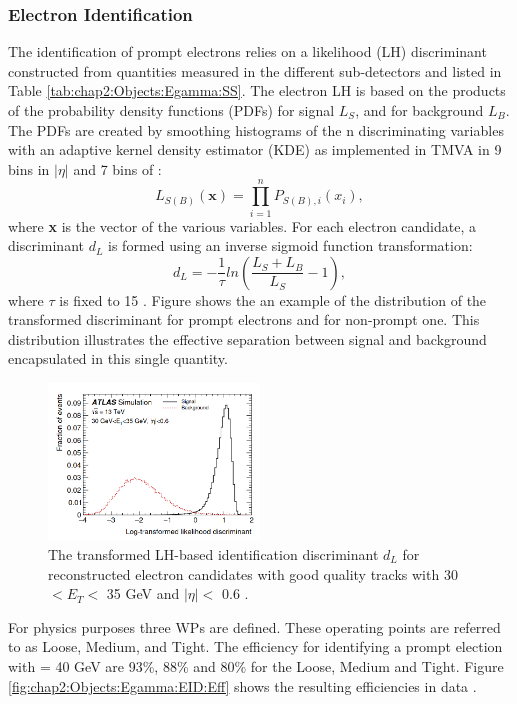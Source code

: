 \subsubsection{Electron Identification}
\label{chap2:Objects:Egamma:EID}
The identification of prompt electrons relies on a likelihood (LH) discriminant constructed from quantities measured in the different sub-detectors and listed in Table \ref{tab:chap2:Objects:Egamma:SS}. The electron LH is based on the products of the probability density functions (PDFs) for signal $L_S$, and for background $L_B$. The PDFs are created by smoothing histograms of the n discriminating variables with an adaptive kernel density estimator (KDE) \cite{KDE} as implemented in TMVA \cite{TMVA} in 9 bins in $|\eta|$ and 7 bins of \eT:
\begin{equation}
    L_{S(B)}(\textbf{x}) = \displaystyle\prod_{i=1}^{n} P_{S(B),i}(x_i),
\end{equation}
where \textbf{x} is the vector of the various variables. For each electron candidate, a discriminant $d_L$ is formed using an inverse sigmoid function transformation:
\begin{equation}
    d_L = -\frac{1}{\tau}ln(\frac{L_S+L_B}{L_S} - 1),
\end{equation}
where $\tau$ is fixed to 15 \cite{TMVA}. Figure shows the an example of the distribution of the transformed discriminant for prompt electrons and for non-prompt one. This distribution illustrates the effective separation between signal and background encapsulated in this single quantity.
\begin{figure}[H]
    \centering
    \includegraphics[width=0.5\textwidth]{Ch2/Img/Electron_LH.png}
    \caption{The transformed LH-based identification discriminant $d_L$ for reconstructed electron candidates with good quality tracks with 30 $<E_T<$ 35 GeV and $|\eta|<$ 0.6 \cite{Electron_ID_2016}.}
    \label{fig:chap2:Objects:Egamma:EID:LH}
\end{figure}
For physics purposes three WPs are defined. These operating points are referred to as Loose, Medium, and Tight. The efficiency for identifying a prompt election with \eT = 40 GeV are 93\%, 88\% and 80\% for the Loose, Medium and Tight. Figure \ref{fig:chap2:Objects:Egamma:EID:Eff} shows the resulting efficiencies in data \cite{Egamma_Perf_run2}. 
